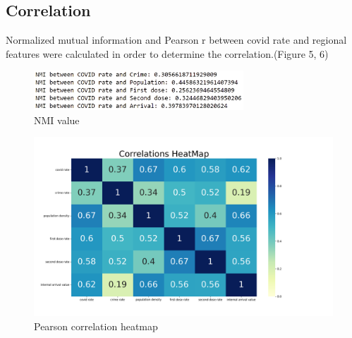 \documentclass[a4, 11pt]{article}
\begin{document}
\subsection{Correlation}
Normalized mutual information and Pearson r between covid rate and regional features were calculated in order to determine the correlation.(Figure 5, 6)
\begin{figure}[ht]
    \centering
    \includegraphics[width=0.7\textwidth]{captures for report/NMI value.png}
    \caption{NMI value}
    \label{fig:my_label}
\end{figure}

\begin{figure}[ht]
    \centering
    \includegraphics[width=1.2\textwidth]{graph/correlation_heatmap.png}
    \caption{Pearson correlation heatmap}
    \label{fig:my_label}
\end{figure}
\end{document}
